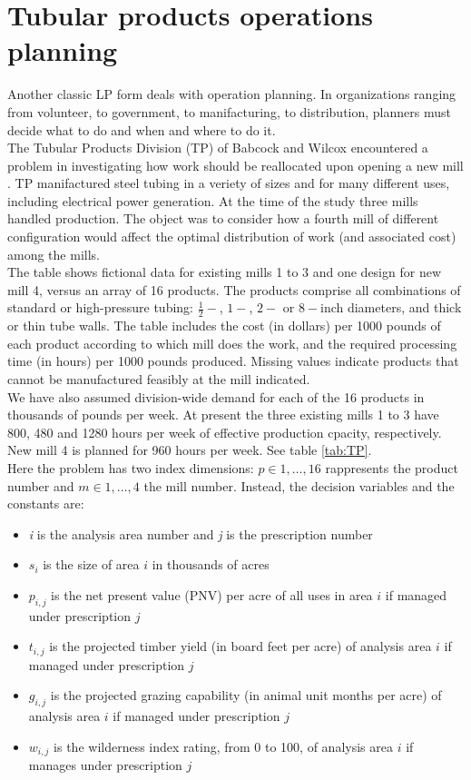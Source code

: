 \documentclass[a4paper,10 pt,titlepage,twoside]{book}
\theoremstyle{plain}
\theoremstyle{definition}
\theoremstyle{remark}
\begin{document}
\section{Tubular products operations planning}
Another classic LP form deals with operation planning. In organizations ranging from volunteer, to government, to manifacturing, to distribution, planners must decide what to do and when and where to do it.\\
The Tubular Products Division (TP) of Babcock and Wilcox encountered a problem in investigating how work should be reallocated upon opening a new mill \cite{FEM}. TP manifactured steel tubing in a veriety of sizes and for many different uses, including electrical power generation. At the time of the study three mills handled production. The object was to consider how a fourth mill of different configuration would affect the optimal distribution of work (and associated cost) among the mills.\\ The table shows fictional data for existing mills 1 to 3 and one design for new mill 4, versus an array of 16 products. The products comprise all combinations of standard or high-pressure tubing: $\frac{1}{2}-$, $1-$, $2-$ or $8-$inch diameters, and thick or thin tube walls. The table includes the cost (in dollars) per 1000 pounds of each product according to which mill does the work, and the required processing time (in hours) per 1000 pounds produced. Missing values indicate products that cannot be manufactured feasibly at the mill indicated.\\
We have also assumed division-wide demand for each of the 16 products in thousands of pounds per week. At present the three existing mills 1 to 3 have 800, 480 and 1280 hours per week of effective production cpacity, respectively. New mill 4 is planned for 960 hours per week. See table \ref{tab:TP}.\\
Here the problem has two index dimensions: $p\in{1, \dots, 16}$ rappresents the product number and $m\in{1, \dots, 4}$ the mill number. Instead, the decision variables and the constants are:
\begin{itemize}
	\item \textit{i} is the analysis area number and \textit{j} is the prescription number
	\item $s_{i}$ is the size of area $i$ in thousands of acres
	\item $p_{i,j}$ is the net present value (PNV) per acre of all uses in area $i$ if managed under prescription $j$
	\item $t_{i,j}$ is the projected timber yield (in board feet per acre) of analysis area $i$ if managed under prescription $j$
	\item $g_{i,j}$ is the projected grazing capability (in animal unit months per acre) of analysis area $i$ if managed under prescription $j$
	\item $w_{i,j}$ is the wilderness index rating, from 0 to 100, of analysis area $i$ if manages under prescription $j$
\end{itemize}
\end{document}
